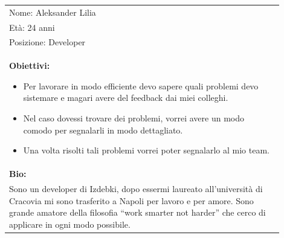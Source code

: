 \documentclass[a4paper, 11pt]{article}
\begin{document}
\begin{table}[H]
    \centering
    \begin{tabular}{|p{0.9\linewidth}|}
        \hline
        Nome: Aleksander Lilia                                                                                                                                                                                                                          \\
        Età: 24 anni                                                                                                                                                                                                                                    \\
        Posizione: Developer                                                                                                                                                                                                                            \\
        \hline
        \begin{minipage}[t]{\linewidth}
            \textbf{Obiettivi:}
            \begin{itemize}
                \item Per lavorare in modo efficiente devo sapere quali problemi devo sistemare e magari avere del feedback dai miei colleghi.
                \item Nel caso dovessi trovare dei problemi, vorrei avere un modo comodo per segnalarli in modo dettagliato.
                \item Una volta risolti tali problemi vorrei poter segnalarlo al mio team.
            \end{itemize}
        \end{minipage}                                                                                                                                                                                                                  \\
        \hline
        \textbf{Bio:}                                                                                                                                                                                                                                   \\
        Sono un developer di Izdebki, dopo essermi laureato all'università di Cracovia mi sono trasferito a Napoli per lavoro e per amore. Sono grande amatore della filosofia “work smarter not harder” che cerco di applicare in ogni modo possibile. \\
        \hline
    \end{tabular}
\end{table}
\end{document}

